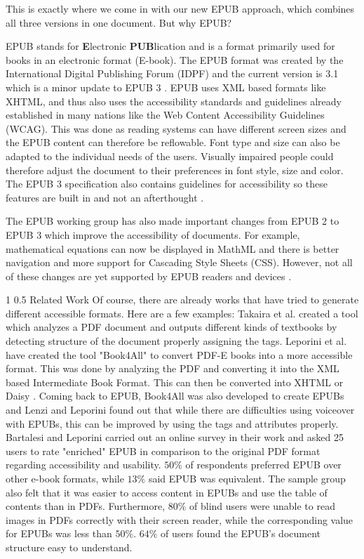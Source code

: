 \documentclass[12pt]{llncs}
\makeatletter
\renewcommand\section{\@startsection 
   {section}{1}{0mm}%
   {1\baselineskip}%
   {0.5\baselineskip}%
   {\bfseries\Large}%
   }
\makeatother
\begin{document}
This is exactly where we come in with our new EPUB approach, which combines all three versions in one document. But why EPUB?

EPUB stands for {\bf E}lectronic {\bf PUB}lication and is a format primarily used for books in an electronic format (E-book). The EPUB format was created by the International Digital Publishing Forum (IDPF) and the current version is 3.1 which is a minor update to EPUB 3 \cite{EPUBspecs}. EPUB uses XML based formats like XHTML, and thus also uses the accessibility standards and guidelines already established in many nations like the Web Content Accessibility Guidelines (WCAG)\cite{WCAG}. This was done as reading systems can have different screen sizes and the EPUB content can therefore be reflowable. Font type and size can also be adapted to the individual needs of the users. Visually impaired people could therefore adjust the document to their preferences in font style, size and color. The EPUB 3 specification also contains guidelines for accessibility so these features are built in and not an afterthought \cite{EPUB3bp}.

The EPUB working group has also made important changes from EPUB 2 to EPUB 3 which improve the accessibility of documents. For example, mathematical equations can now be displayed in MathML and there is better navigation and more support for Cascading Style Sheets (CSS). However, not all of these changes are yet supported by EPUB readers and devices \cite{EPUB30changes}. 

\section{Related Work}
Of course, there are already works that have tried to generate different accessible formats. Here are a few examples: 
Takaira et al. \cite{unified} created a tool which analyzes a PDF document and outputs different kinds of textbooks by detecting structure of the document properly assigning the tags.
Leporini et al. \cite{book4all} have created the tool "Book4All" to convert PDF-E books into a more accessible format. This was done by analyzing the PDF and converting it into the XML based Intermediate Book Format. This can then be converted into XHTML or Daisy \cite{daisyAccessibility}. 
Coming back to EPUB, Book4All was also developed to create EPUBs and Lenzi and Leporini \cite{voiceover} found out that while there are difficulties using voiceover with EPUBs, this can be improved by using the tags and attributes properly. 
Bartalesi and Leporini \cite{enrichEPUB} carried out an online survey in their work and asked 25 users to rate "enriched" EPUB in comparison to the original PDF format regarding accessibility and usability. $50\%$ of respondents preferred EPUB over other e-book formats, while $13\%$ said EPUB was equivalent.
The sample group also felt that it was easier to access content in EPUBs and use the table of contents than in PDFs.
Furthermore, $80\%$ of blind users were unable to read images in PDFs correctly with their screen reader, while the corresponding value for EPUBs was less than $50\%$. $64\%$ of users found the EPUB's document structure easy to understand. 
\end{document}
